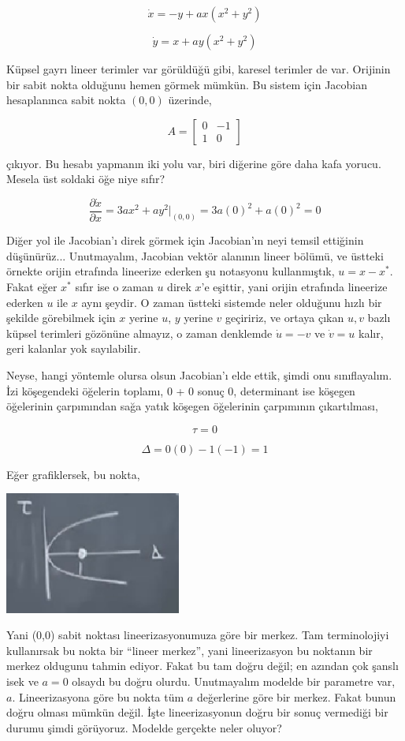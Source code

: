 \documentclass[12pt,fleqn]{article}\usepackage{../../common}
\begin{document}
$$ \dot{x} = -y + ax(x^2 + y^2) $$

$$ \dot{y} = x + ay (x^2 + y^2) $$

Küpsel gayrı lineer terimler var görüldüğü gibi, karesel terimler de
var. Orijinin bir sabit nokta olduğunu hemen görmek mümkün. Bu sistem için
Jacobian hesaplanınca sabit nokta $(0,0)$ üzerinde,

$$ A = \left[\begin{array}{rrr}
0  & -1 \\ 1 & 0
\end{array}\right] $$

çıkıyor. Bu hesabı yapmanın iki yolu var, biri diğerine göre daha kafa
yorucu. Mesela üst soldaki öğe niye sıfır?

$$ \frac{\partial \dot{x}}{\partial x} =
3ax^2 + ay^2 \bigg|_{(0,0)} = 3a(0)^2 + a(0)^2 = 0
$$

Diğer yol ile Jacobian'ı direk görmek için Jacobian'ın neyi temsil ettiğinin
düşünürüz... Unutmayalım, Jacobian vektör alanının lineer bölümü, ve üstteki
örnekte orijin etrafında lineerize ederken şu notasyonu kullanmıştık, $u = x -
x^*$. Fakat eğer $x^*$ sıfır ise o zaman $u$ direk $x$'e eşittir, yani orijin
etrafında lineerize ederken $u$ ile $x$ aynı şeydir. O zaman üstteki sistemde
neler olduğunu hızlı bir şekilde görebilmek için $x$ yerine $u$, $y$ yerine $v$
geçiririz, ve ortaya çıkan $u,v$ bazlı küpsel terimleri gözönüne almayız, o
zaman denklemde $\dot{u} = -v$ ve $\dot{v} = u$ kalır, geri kalanlar yok
sayılabilir.

Neyse, hangi yöntemle olursa olsun Jacobian'ı elde ettik, şimdi onu
sınıflayalım. İzi köşegendeki öğelerin toplamı, 0 + 0 sonuç 0, determinant ise
köşegen öğelerinin çarpımından sağa yatık köşegen öğelerinin çarpımının
çıkartılması,

$$ \tau = 0 $$

$$ \Delta = 0(0) - 1(-1) = 1 $$

Eğer grafiklersek, bu nokta,

\includegraphics[height=4cm]{06_02.png}

Yani (0,0) sabit noktası lineerizasyonumuza göre bir merkez. Tam terminolojiyi
kullanırsak bu nokta bir ``lineer merkez'', yani lineerizasyon bu noktanın bir
merkez oldugunu tahmin ediyor. Fakat bu tam doğru değil; en azından çok şanslı
isek ve $a=0$ olsaydı bu doğru olurdu. Unutmayalım modelde bir parametre var,
$a$. Lineerizasyona göre bu nokta tüm $a$ değerlerine göre bir merkez. Fakat
bunun doğru olması mümkün değil. İşte lineerizasyonun doğru bir sonuç vermediği
bir durumu şimdi görüyoruz. Modelde gerçekte neler oluyor?
\end{document}
